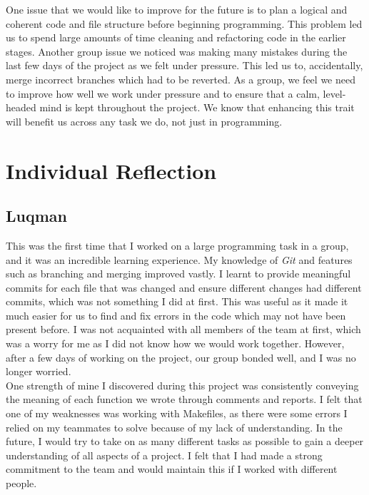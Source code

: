 \documentclass[10pt]{article}
\begin{document}
One issue that we would like to improve for the future is to plan a logical and coherent code and file structure before beginning programming. This problem led us to spend large amounts of time cleaning and refactoring code in the earlier stages. Another group issue we noticed was making many mistakes during the last few days of the project as we felt under pressure. This led us to, accidentally, merge incorrect branches which had to be reverted. As a group, we feel we need to improve how well we work under pressure and to ensure that a calm, level-headed mind is kept throughout the project. We know that enhancing this trait will benefit us across any task we do, not just in programming. 

\section*{Individual Reflection}

\subsection*{Luqman}

This was the first time that I worked on a large programming task in a group, and it was an incredible learning experience. My knowledge of {\sl Git} and features such as branching and merging improved vastly. I learnt to provide meaningful commits for each file that was changed and ensure different changes had different commits, which was not something I did at first. This was useful as it made it much easier for us to find and fix errors in the code which may not have been present before. I was not acquainted with all members of the team at first, which was a worry for me as I did not know how we would work together. However, after a few days of working on the project, our group bonded well, and I was no longer worried. 
\\

One strength of mine I discovered during this project was consistently conveying the meaning of each function we wrote through comments and reports. I felt that one of my weaknesses was working with Makefiles, as there were some errors I relied on my teammates to solve because of my lack of understanding. In the future, I would try to take on as many different tasks as possible to gain a deeper understanding of all aspects of a project. I felt that I had made a strong commitment to the team and would maintain this if I worked with different people.  
\end{document}
